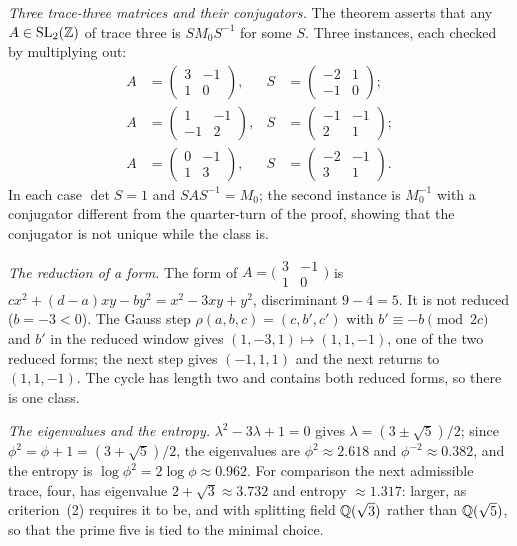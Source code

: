 \documentclass[11pt,a4paper]{article}
\theoremstyle{plain}
\theoremstyle{definition}
\theoremstyle{remark}
\begin{document}
\emph{Three trace-three matrices and their conjugators.} The theorem asserts that any $A\in\mathrm{SL}_{2}(\mathbb{Z})$ of trace three is $SM_{0}S^{-1}$ for some $S$. Three instances, each checked by multiplying out:
\begin{align*}
A&=\begin{pmatrix}3&-1\\1&0\end{pmatrix},& S&=\begin{pmatrix}-2&1\\-1&0\end{pmatrix};\\
A&=\begin{pmatrix}1&-1\\-1&2\end{pmatrix},& S&=\begin{pmatrix}-1&-1\\2&1\end{pmatrix};\\
A&=\begin{pmatrix}0&-1\\1&3\end{pmatrix},& S&=\begin{pmatrix}-2&-1\\3&1\end{pmatrix}.
\end{align*}
In each case $\det S=1$ and $SAS^{-1}=M_{0}$; the second instance is $M_{0}^{-1}$ with a conjugator different from the quarter-turn of the proof, showing that the conjugator is not unique while the class is.

\emph{The reduction of a form.} The form of $A=\bigl(\begin{smallmatrix}3&-1\\1&0\end{smallmatrix}\bigr)$ is $cx^{2}+(d-a)xy-by^{2}=x^{2}-3xy+y^{2}$, discriminant $9-4=5$. It is not reduced ($b=-3<0$). The Gauss step $\rho(a,b,c)=(c,b',c')$ with $b'\equiv-b\pmod{2c}$ and $b'$ in the reduced window gives $(1,-3,1)\mapsto(1,1,-1)$, one of the two reduced forms; the next step gives $(-1,1,1)$ and the next returns to $(1,1,-1)$. The cycle has length two and contains both reduced forms, so there is one class.

\emph{The eigenvalues and the entropy.} $\lambda^{2}-3\lambda+1=0$ gives $\lambda=(3\pm\sqrt5)/2$; since $\phi^{2}=\phi+1=(3+\sqrt5)/2$, the eigenvalues are $\phi^{2}\approx2.618$ and $\phi^{-2}\approx0.382$, and the entropy is $\log\phi^{2}=2\log\phi\approx0.962$. For comparison the next admissible trace, four, has eigenvalue $2+\sqrt3\approx3.732$ and entropy $\approx1.317$: larger, as criterion~(2) requires it to be, and with splitting field $\mathbb{Q}(\sqrt3)$ rather than $\mathbb{Q}(\sqrt5)$, so that the prime five is tied to the minimal choice.
\end{document}
